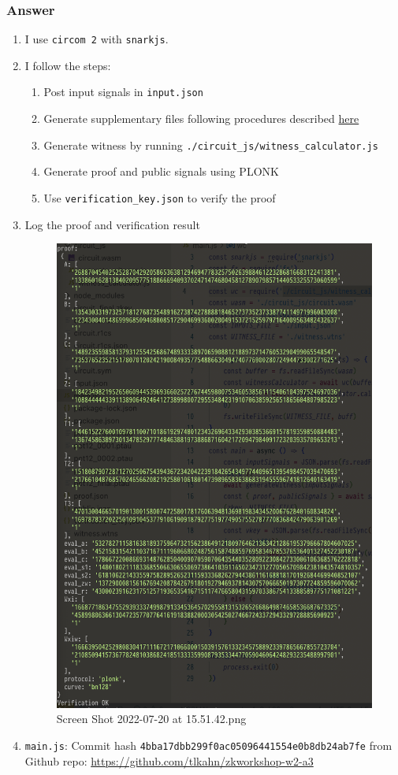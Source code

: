 \documentclass[11pt]{article}
\begin{document}
\subsubsection{Answer}
\label{answer}
\begin{enumerate}
\item I use \texttt{circom 2} with \texttt{snarkjs}.

\item I follow the steps:

\begin{enumerate}
\item Post input signals in \texttt{input.json}
\item Generate supplementary files following procedures described \href{https://www.samsclass.info/141/proj/C523.htm}{here}
\item Generate witness by running \texttt{./circuit\_js/witness\_calculator.js}
\item Generate proof and public signals using PLONK
\item Use \texttt{verification\_key.json} to verify the proof
\end{enumerate}

\item Log the proof and verification result

\begin{figure}[htbp]
\centering
\includegraphics[width=.9\linewidth]{./img/2.png}
\caption{Screen Shot 2022-07-20 at 15.51.42.png}
\end{figure}

\item \texttt{main.js}: Commit hash \texttt{4bba17dbb299f0ac05096441554e0b8db24ab7fe} from Github repo: \url{https://github.com/tlkahn/zkworkshop-w2-a3}
\end{enumerate}
\end{document}

